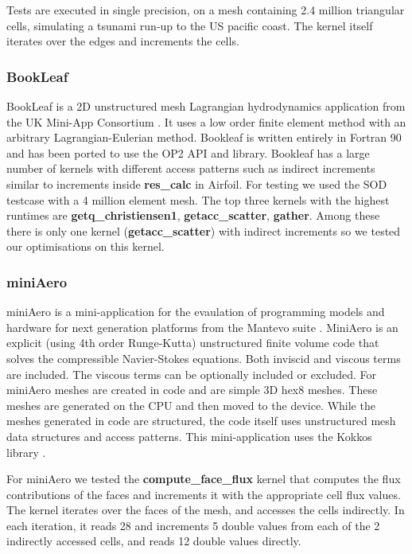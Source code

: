 Tests are executed in single precision, on a mesh containing 2.4 million
triangular cells, simulating a tsunami run-up to the US pacific coast. The
kernel itself iterates over the edges and increments the cells.

\subsubsection{BookLeaf}
BookLeaf is a 2D unstructured mesh Lagrangian hydrodynamics application from the
UK Mini-App Consortium \cite{uk-mac}. It uses a low order finite element method
with an arbitrary Lagrangian-Eulerian method.  Bookleaf is written entirely in
Fortran 90 and has been ported to use the OP2 API and library. Bookleaf has a
large number of kernels with different access patterns such as indirect
increments similar to increments inside \textbf{res\_calc} in Airfoil. For
testing we used the SOD testcase with a 4 million element mesh. The top three
kernels with the highest runtimes are \textbf{getq\_christiensen1},
\textbf{getacc\_scatter}, \textbf{gather}. Among these there is only
one kernel (\textbf{getacc\_scatter}) with indirect increments so we tested our
optimisations on this kernel.

\subsubsection{miniAero}\label{sec:mini-aero-summary}

miniAero \cite{miniaero} is a mini-application for the evaulation of programming
models and hardware for next generation platforms from the Mantevo suite
\cite{heroux2009improving}. MiniAero is an explicit (using 4th order
Runge-Kutta) unstructured finite volume code that solves the compressible
Navier-Stokes equations. Both inviscid and viscous terms are included. The
viscous terms can be optionally included or excluded. For miniAero meshes are
created in code and are simple 3D hex8 meshes. These meshes are generated on the
CPU and then moved to the device. While the meshes generated in code are
structured, the code itself uses unstructured mesh data structures and access
patterns. This mini-application uses the Kokkos library
\cite{CarterEdwards20143202}.

For miniAero we tested the \textbf{compute\_face\_flux} kernel that computes the
flux contributions of the faces and increments it with the appropriate cell flux
values. The kernel iterates over the faces of the mesh, and accesses the cells
indirectly. In each iteration, it reads 28 and increments 5 double values from
each of the 2 indirectly accessed cells, and reads 12 double values directly.


